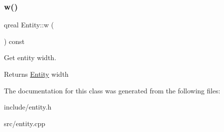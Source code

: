 \subsubsection{\texorpdfstring{w()}{w()}}
{\footnotesize\ttfamily qreal Entity\+::w (\begin{DoxyParamCaption}{ }\end{DoxyParamCaption}) const}



Get entity width. 

\begin{DoxyReturn}{Returns}
\hyperlink{class_entity}{Entity} width 
\end{DoxyReturn}


The documentation for this class was generated from the following files\+:\begin{DoxyCompactItemize}
\item 
include/entity.\+h\item 
src/entity.\+cpp\end{DoxyCompactItemize}
